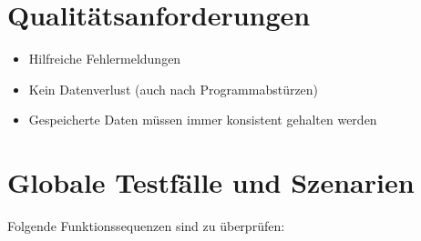 \documentclass[10pt,a4paper]{article}
\begin{document}
\section{Qualitätsanforderungen}
\begin{itemize}
	\item Hilfreiche Fehlermeldungen
	\item Kein Datenverlust (auch nach Programmabstürzen)
	\item Gespeicherte Daten müssen immer konsistent gehalten werden
\end{itemize}
\newpage


\section{Globale Testfälle und Szenarien}
Folgende Funktionssequenzen sind zu überprüfen:
\end{document}
